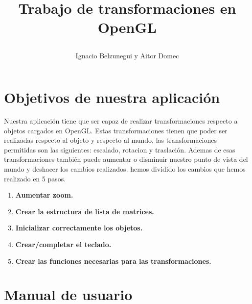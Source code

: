 \documentclass[12pt,a4paper]{article}
\begin{document}
\title{\begin{center}
\end{center}
\vspace{1cm}
Trabajo de transformaciones en OpenGL}

\author{Ignacio Belzunegui y Aitor Domec}

\maketitle

\section{Objetivos de nuestra aplicación}

Nuestra aplicación tiene que ser capaz de realizar transformaciones respecto a objetos cargados en OpenGL. Estas transformaciones tienen que poder ser realizadas respecto al objeto y respecto al mundo, las transformaciones permitidas son las siguientes: escalado, rotacion y traslación. Ademas de esas transformaciones también puede aumentar o disminuir nuestro punto de vista del mundo y deshacer los cambios realizados. \newline
hemos dividido los cambios que hemos realizado en 5 pasos.
\begin{enumerate}
\item \textbf{Aumentar zoom.}
\item \textbf{Crear la estructura de lista de matrices.}
\item \textbf{Inicializar correctamente los objetos.}
\item \textbf{Crear/completar el teclado.}
\item \textbf{Crear las funciones necesarias para las transformaciones.}
\end{enumerate}


\section{Manual de usuario}
\end{document}
